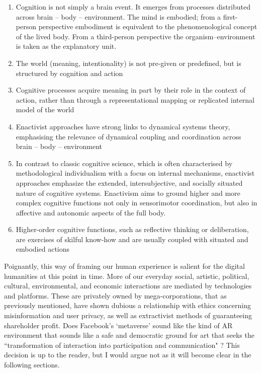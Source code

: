 \begin{enumerate}
    \item Cognition is not simply a brain event. It emerges from processes distributed across brain – body – environment. The mind is embodied; from a first-person perspective embodiment is equivalent to the phenomenological concept of the lived body. From a third-person perspective the organism–environment is taken as the explanatory unit.
    \item The world (meaning, intentionality) is not pre-given or predefined, but is structured by cognition and action
    \item Cognitive processes acquire meaning in part by their role in the context of action, rather than through a representational mapping or replicated internal model of the world
    \item Enactivist approaches have strong links to dynamical systems theory, emphasising the relevance of dynamical coupling and coordination across brain – body – environment
    \item In contrast to classic cognitive science, which is often characterised by methodological individualism with a focus on internal mechanisms, enactivist approaches emphasize the extended, intersubjective, and socially situated nature of cognitive systems. Enactivism aims to ground higher and more complex cognitive functions not only in sensorimotor coordination, but also in affective and autonomic aspects of the full body.
    \item Higher-order cognitive functions, such as reflective thinking or deliberation, are exercises of skilful know-how and are usually coupled with situated and embodied actions
\end{enumerate}
Poignantly, this way of framing our human experience is salient for the digital humanities at this point in time. More of our everyday social, artistic, political, cultural, environmental, and economic interactions are mediated by technologies and platforms. These are privately owned by mega-corporations, that as previously mentioned, have shown dubious a relationship with ethics concerning misinformation and user privacy, as well as extractivist methods of guaranteeing shareholder profit. Does Facebook's `metaverse' sound like the kind of AR environment that sounds like a safe and democratic ground for art that seeks the ``transformation of interaction into participation and communication" \citep[]{dewey1934}? This decision is up to the reader, but I would argue not as it will become clear in the following sections.

